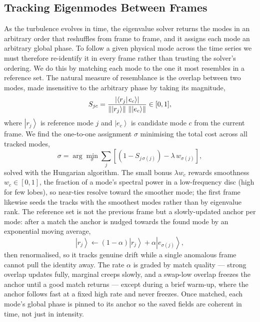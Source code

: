 \documentclass[]{article}
\newcommand{\abs}[1]{\left| #1 \right|}
\newcommand{\ket}[1]{\left| #1 \right\rangle}
\newcommand{\braket}[2]{\left\langle {#1{\left|\vphantom{#1 #2} \right.} #2} \right\rangle}
\begin{document}
\subsection{Tracking Eigenmodes Between Frames}
As the turbulence evolves in time, the eigenvalue solver returns the modes in an arbitrary order that reshuffles from frame to frame, and it assigns each mode an arbitrary global phase. To follow a given physical mode across the time series we must therefore re-identify it in every frame rather than trusting the solver's ordering. We do this by matching each mode to the one it most resembles in a reference set. The natural measure of resemblance is the overlap between two modes, made insensitive to the arbitrary phase by taking its magnitude,
\begin{equation}
    S_{jc} = \frac{\abs{\braket{r_j}{e_c}}}{\left\| \ket{r_j} \right\| \, \left\| \ket{e_c} \right\|} \in [0,1],
\end{equation}
where $\ket{r_j}$ is reference mode $j$ and $\ket{e_c}$ is candidate mode $c$ from the current frame. We find the one-to-one assignment $\sigma$ minimising the total cost across all tracked modes,
\begin{equation}
    \sigma = \arg\min_{\sigma} \sum_j \left[ \left( 1 - S_{j\,\sigma(j)} \right) - \lambda \, w_{\sigma(j)} \right],
\end{equation}
solved with the Hungarian algorithm. The small bonus $\lambda w_c$ rewards smoothness $w_c\in[0,1]$, the fraction of a mode's spectral power in a low-frequency disc (high for few lobes), so near-ties resolve toward the smoother mode; the first frame likewise seeds the tracks with the smoothest modes rather than by eigenvalue rank. The reference set is not the previous frame but a slowly-updated anchor per mode: after a match the anchor is nudged towards the found mode by an exponential moving average,
\begin{equation}
    \ket{r_j} \leftarrow (1-\alpha)\ket{r_j} + \alpha \ket{e_{\sigma(j)}},
\end{equation}
then renormalised, so it tracks genuine drift while a single anomalous frame cannot pull the identity away. The rate $\alpha$ is graded by match quality --- strong overlap updates fully, marginal creeps slowly, and a swap-low overlap freezes the anchor until a good match returns --- except during a brief warm-up, where the anchor follows fast at a fixed high rate and never freezes. Once matched, each mode's global phase is pinned to its anchor so the saved fields are coherent in time, not just in intensity.
\end{document}
